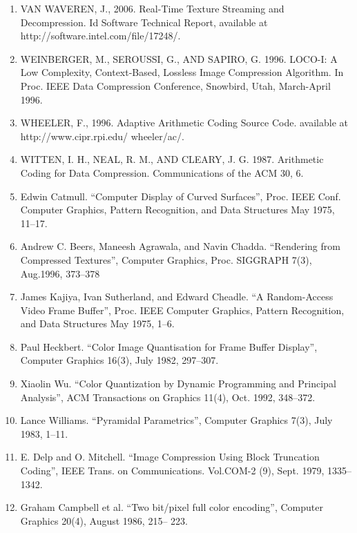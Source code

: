 \documentclass{article}
\begin{document}
\begin{enumerate}
	\item VAN WAVEREN, J., 2006. Real-Time Texture Streaming and
	Decompression. Id Software Technical Report, available at
	http://software.intel.com/file/17248/.
	\item WEINBERGER, M., SEROUSSI, G., AND SAPIRO, G. 1996.
	LOCO-I: A Low Complexity, Context-Based, Lossless Image
	Compression Algorithm. In Proc. IEEE Data Compression Conference, Snowbird, Utah, March-April 1996.
	
	\item WHEELER, F., 1996. Adaptive Arithmetic Coding Source Code.
	available at http://www.cipr.rpi.edu/ wheeler/ac/.
	
	\item WITTEN, I. H., NEAL, R. M., AND CLEARY, J. G. 1987. Arithmetic Coding for Data Compression. Communications of the	ACM 30, 6.
	
	\item Edwin Catmull. “Computer Display of Curved Surfaces”, Proc. IEEE Conf. Computer Graphics, Pattern Recognition, and Data Structures May 1975, 11–17.

	\item Andrew C. Beers, Maneesh Agrawala, and Navin
	Chadda. “Rendering from Compressed Textures”,
	Computer Graphics, Proc. SIGGRAPH 7(3),
	Aug.1996, 373–378

	\item James Kajiya, Ivan Sutherland, and Edward Cheadle.
	“A Random-Access Video Frame Buffer”, Proc. IEEE
	Computer Graphics, Pattern Recognition, and Data
	Structures May 1975, 1–6.

	\item Paul Heckbert. “Color Image Quantisation for Frame
	Buffer Display”, Computer Graphics 16(3), July 1982,
	297–307.
	
	\item Xiaolin Wu. “Color Quantization by Dynamic Programming and Principal Analysis”, ACM Transactions
	on Graphics 11(4), Oct. 1992, 348–372.
	
	\item Lance Williams. “Pyramidal Parametrics”, Computer
	Graphics 7(3), July 1983, 1–11.
	
	\item E. Delp and O. Mitchell. “Image Compression Using
	Block Truncation Coding”, IEEE Trans. on Communications. Vol.COM-2 (9), Sept. 1979, 1335–1342.

	\item Graham Campbell et al. “Two bit/pixel full color encoding”, Computer Graphics 20(4), August 1986, 215–
	223.


\end{enumerate}
\end{document}
